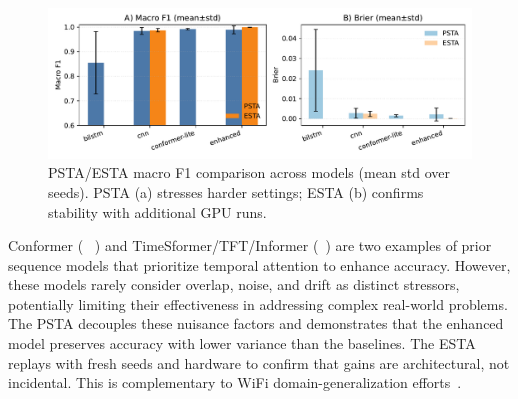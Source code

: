 \documentclass[journal]{IEEEtran}
\begin{document}
\begin{figure}[ht]
\centering
\includegraphics[width=\columnwidth]{figures/fig8_d56_composite.pdf}
\caption{PSTA/ESTA macro F1 comparison across models (mean \textpm{} std over seeds). PSTA (a) stresses harder settings; ESTA (b) confirms stability with additional GPU runs.}
\label{fig:d5d6_results}
\end{figure}


Conformer (~\cite{gulati2020conformer} ) and TimeSformer/TFT/Informer (~\cite{bertasius2021timesformer,lim2021tft,zhou2021informer}) are two examples of prior sequence models that prioritize temporal attention to enhance accuracy. However, these models rarely consider overlap, noise, and drift as distinct stressors, potentially limiting their effectiveness in addressing complex real-world problems. The PSTA decouples these nuisance factors and demonstrates that the enhanced model preserves accuracy with lower variance than the baselines. The ESTA replays with fresh seeds and hardware to confirm that gains are architectural, not incidental. This is complementary to WiFi domain-generalization efforts~\cite{airfi2022,fewsense2022,rewis2022}.
\end{document}
